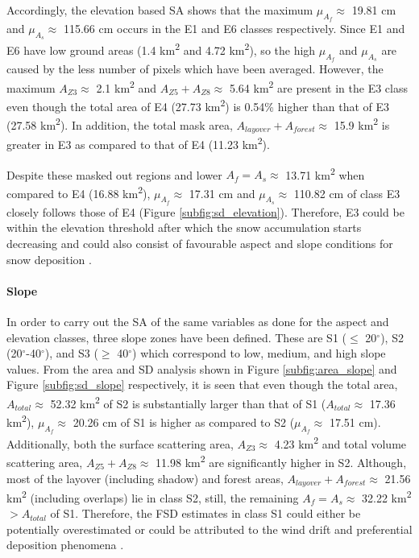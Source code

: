\documentclass[review]{elsarticle}
\numberwithin{equation}{section}
\numberwithin{figure}{section}
\numberwithin{table}{section}
\begin{document}
Accordingly, the elevation based SA shows that the maximum $\mu_{A_f} \approx$ 19.81 cm and $\mu_{A_s} \approx$ 115.66 cm occurs in the E1 and E6 classes respectively. Since E1 and E6 have low ground areas (1.4 km\textsuperscript{2} and 4.72 km\textsuperscript{2}), so the high $\mu_{A_f}$ and $\mu_{A_s}$ are caused by the less number of pixels which have been averaged. However, the maximum $A_{Z3} \approx$ 2.1 km\textsuperscript{2} and $A_{Z5} + A_{Z8} \approx$ 5.64 km\textsuperscript{2} are present in the E3 class even though the total area of E4 (27.73 km\textsuperscript{2}) is 0.54\% higher than that of E3 (27.58 km\textsuperscript{2}). In addition, the total mask area, $A_{layover} + A_{forest} \approx$ 15.9 km\textsuperscript{2} is greater in E3 as compared to that of E4 (11.23 km\textsuperscript{2}).

Despite these masked out regions and lower $A_f = A_s \approx$ 13.71 km\textsuperscript{2} when compared to E4 (16.88 km\textsuperscript{2}), $\mu_{A_f} \approx$ 17.31 cm and $\mu_{A_s} \approx$ 110.82 cm of class E3 closely follows those of E4 (Figure \ref{subfig:sd_elevation}). Therefore, E3 could be within the elevation threshold after which the snow accumulation starts decreasing and could also consist of favourable aspect and slope conditions for snow deposition \citep{Jain2009, Lehning2008}.

\paragraph*{Slope}
In order to carry out the SA of the same variables as done for the aspect and elevation classes, three slope zones have been defined. These are S1 ($\le$ 20$^\circ$), S2 (20$^\circ$-40$^\circ$), and S3 ($\ge$ 40$^\circ$) which correspond to low, medium, and high slope values. From the area and SD analysis shown in Figure \ref{subfig:area_slope} and Figure \ref{subfig:sd_slope} respectively, it is seen that even though the total area, $A_{total} \approx$ 52.32 km\textsuperscript{2} of S2 is substantially larger than that of S1 ($A_{total} \approx$ 17.36 km\textsuperscript{2}), $\mu_{A_f} \approx$ 20.26 cm of S1 is higher as compared to S2 ($\mu_{A_f} \approx$ 17.51 cm). Additionally, both the surface scattering area, $A_{Z3} \approx$ 4.23 km\textsuperscript{2} and total volume scattering area, $A_{Z5} + A_{Z8} \approx$ 11.98 km\textsuperscript{2} are significantly higher in S2. Although, most of the layover (including shadow) and forest areas, $A_{layover} + A_{forest} \approx$ 21.56 km\textsuperscript{2} (including overlaps) lie in class S2, still, the remaining $A_f = A_s \approx$ 32.22 km\textsuperscript{2} $> A_{total}$ of S1. Therefore, the FSD estimates in class S1 could either be potentially overestimated or could be attributed to the wind drift and preferential deposition phenomena \citep{Lehning2008}.
\end{document}
